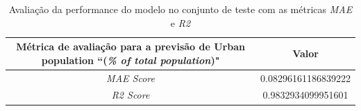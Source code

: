 \begin{table}[H]
    \centering
    \begin{tabular}{|c|c|}
        \hline
        \multicolumn{1}{|p{5cm}|}{Métrica de avaliação para a previsão de Urban population ``(\emph{\% of total population})"} & Valor \\
        \hline
        \emph{MAE Score} & 0.08296161186839222 \\
        \hline 
        \emph{R2 Score} & 0.9832934099951601 \\
        \hline
    \end{tabular}
    \caption{Avaliação da performance do modelo no conjunto de teste com as métricas \emph{MAE} e \emph{R2}}    
\end{table}